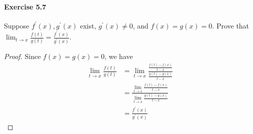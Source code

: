 \documentclass{article}
\theoremstyle{definition}
\begin{document}
\paragraph{Exercise 5.7} Suppose $f^{\prime}(x), g^{\prime}(x)$ exist, $g^{\prime}(x) \neq 0$, and $f(x)=g(x)=0$. Prove that $\lim _{t \rightarrow x} \frac{f(t)}{g(t)}=\frac{f^{\prime}(x)}{g^{\prime}(x)}.$
\begin{proof}
    Since $f(x)=g(x)=0$, we have
$$
\begin{aligned}
\lim _{t \rightarrow x} \frac{f(t)}{g(t)} &=\lim _{t \rightarrow x} \frac{\frac{f(t)-f(x)}{t-x}}{\frac{g(t)-g(x)}{t-x}} \\
&=\frac{\lim _{t \rightarrow x} \frac{f(t)-f(x)}{t-x}}{\lim _{t \rightarrow x} \frac{g(t)-g(x)}{t-x}} \\
&=\frac{f^{\prime}(x)}{g^{\prime}(x)}
\end{aligned}
$$
\end{proof}
\end{document}

